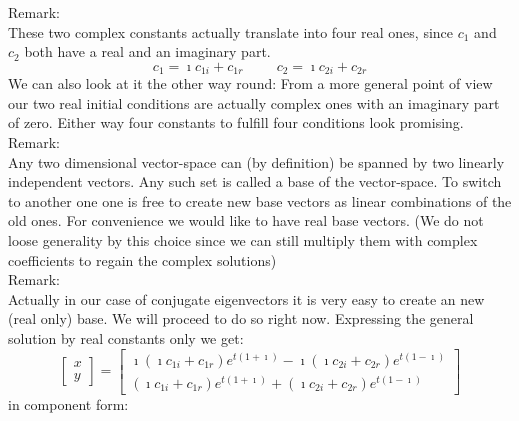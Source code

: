           Remark:\\           These two complex constants actually translate into  four real ones, since $c_1$ and $c_2$ both have a real and an imaginary part.
	  \[c_1=\mathbf{\imath} c_{1i} + c_{1r}\hspace{1cm}c_2=\mathbf{\imath} c_{2i} + c_{2r}\]
We can also look at it the other way round: From a more general point of view our two real initial conditions are actually complex ones with an imaginary part of zero.	  Either way four constants to fulfill four conditions look promising.
	  Remark:\\ 	  Any two dimensional vector-space can (by definition) be spanned by two linearly independent vectors.	  Any such set is called a base of the vector-space. 	  To switch to another one one is free to  create new base vectors as linear combinations of the old ones.	  For convenience we would like to have real base vectors. (We do not loose generality by this choice since we 	  can still multiply them with complex coefficients to regain the complex solutions)	  \\Remark:\\ 	  Actually in our case of conjugate eigenvectors it is very easy to create an new (real only) base.	  We will proceed to do so right now.          Expressing the general solution by real constants only we get:
	  \[\left[\begin{smallmatrix}x\\y\end{smallmatrix}\right]=\left[\begin{smallmatrix}\mathbf{\imath} \left(\mathbf{\imath} c_{1i} + c_{1r}\right) e^{t \left(1 + \mathbf{\imath}\right)} - \mathbf{\imath} \left(\mathbf{\imath} c_{2i} + c_{2r}\right) e^{t \left(1 - \mathbf{\imath}\right)}\\\left(\mathbf{\imath} c_{1i} + c_{1r}\right) e^{t \left(1 + \mathbf{\imath}\right)} + \left(\mathbf{\imath} c_{2i} + c_{2r}\right) e^{t \left(1 - \mathbf{\imath}\right)}\end{smallmatrix}\right]\]          in component form:
